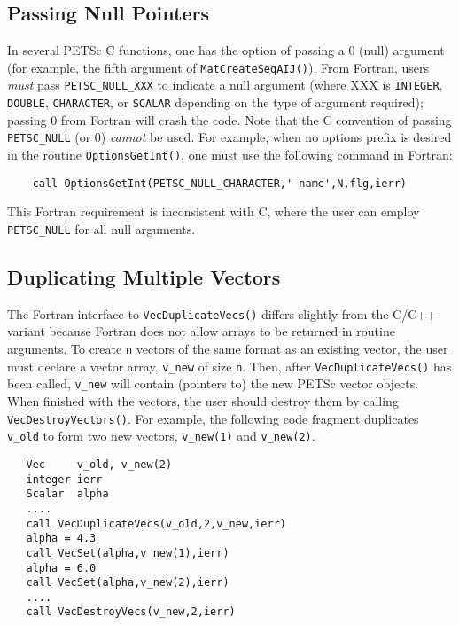 {\subsection{Passing Null Pointers}

In several PETSc C functions, one has the option of passing a 0 (null)
argument (for example, the fifth argument of {\tt MatCreateSeqAIJ()}).
From Fortran, users {\em must} pass {\tt PETSC\_NULL\_XXX} to indicate a
null argument (where XXX is {\tt INTEGER}, {\tt DOUBLE}, {\tt CHARACTER},
or {\tt SCALAR} depending on the type of argument required); 
 passing  0 from 
 Fortran   will crash
the code.   Note
that the C convention of passing {\tt PETSC\_NULL} (or 0) {\em cannot}
be used.  For example, when no options prefix is desired in the
routine {\tt OptionsGetInt()}, one must use the following command in
Fortran:
\begin{verbatim}
    call OptionsGetInt(PETSC_NULL_CHARACTER,'-name',N,flg,ierr)
\end{verbatim}

This Fortran requirement is inconsistent with C, where the 
user can employ {\tt PETSC\_NULL} for all null arguments. 

\subsection{Duplicating Multiple Vectors}
\label{sec:fortvecd}

The Fortran interface to {\tt VecDuplicateVecs()} differs slightly
from the C/C++ variant because Fortran does not allow arrays to be
returned in routine arguments.  To create {\tt n} vectors of the same
format as an existing vector, the user must declare a vector array,
{\tt v\_new} of size {\tt n}.  Then, after {\tt VecDuplicateVecs()} has
been called, {\tt v\_new} will contain (pointers to) the new PETSc
vector objects.  When finished with the vectors, the user should
destroy them by calling {\tt VecDestroyVectors()}.
 For example, the following code fragment
duplicates {\tt v\_old} to form two new vectors, {\tt v\_new(1)} and {\tt v\_new(2)}.
\begin{verbatim}
   Vec     v_old, v_new(2)
   integer ierr
   Scalar  alpha
   ....
   call VecDuplicateVecs(v_old,2,v_new,ierr)
   alpha = 4.3
   call VecSet(alpha,v_new(1),ierr)
   alpha = 6.0
   call VecSet(alpha,v_new(2),ierr)
   ....
   call VecDestroyVecs(v_new,2,ierr)
\end{verbatim}

}
